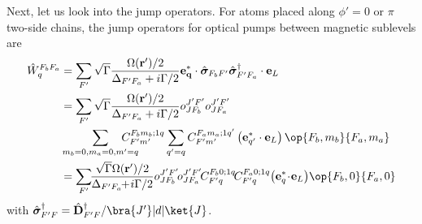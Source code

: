 \documentclass[]{report}
\begin{document}
Next, let us look into the jump operators.
For atoms placed along $ \phi'=0 $ or $ \pi $ two-side chains, the jump operators for optical pumps between magnetic sublevels are \cite{Deutsch2010a}
\begin{align} \label{Eq::JumpOperators}
\hat{W}_q^{F_bF_a} &= \sum_{F'} \sqrt{\Gamma}\frac{\Omega(\mathbf{r}')/2}{ \Delta_{F'F_a} + i\Gamma/2} \mathbf{e^*_q} \cdot \hat{\boldsymbol{\sigma}}_{F_bF'} \hat{\boldsymbol{\sigma}}_{F'F_a}^{\dagger} \cdot \mathbf{e}_L \\
&= \sum_{F'} \sqrt{\Gamma}\frac{\Omega(\mathbf{r}')/2}{ \Delta_{F'F_a} + i\Gamma/2} o^{J'F'}_{JF_b} o^{J'F'}_{JF_a}\nonumber\\
& \sum_{m_b=0,m_a=0,m'=q}\!\!\!\!\!\!\!\!\!\! C^{F_b m_b;1q}_{F' m'} \sum_{q'=q}C^{F_a m_a;1q'}_{F' m'} \left(\mathbf{e}^*_{q'} \cdot\mathbf{e}_L \right) \op{F_b,m_b}{F_a,m_a}\\
&= \sum_{F'} \!\!\frac{\sqrt{\Gamma}\Omega(\mathbf{r}')/2}{ \Delta_{F'F_a} \!\!+\! i\Gamma/2} o^{J'F'}_{JF_b}\! o^{J'F'}_{JF_a}\!  C^{F_b 0;1q}_{F' q}\! C^{F_a 0;1q}_{F' q}\! \left(\mathbf{e}^*_{q}\! \cdot\! \mathbf{e}_L \right)\! \op{F_b,0}{F_a,0}
\end{align}
with $ \hat{\boldsymbol{\sigma}}_{F'F}^{\dagger}=\hat{\mathbf{D}}_{F'F}^{\dagger}/\bra{J'}| d |\ket{J} $.

\end{document}
